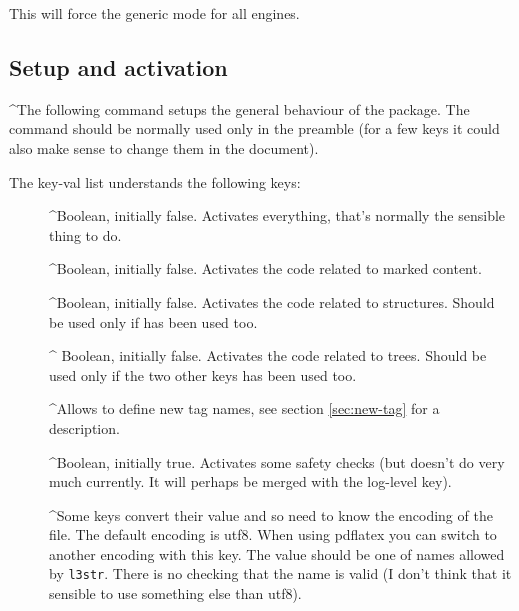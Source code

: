 \documentclass[DIV=12,parskip=half-,bibliography=totoc]{scrartcl}
\begin{document}

\TagP This will force the generic mode for all engines. \TagPend




\subsection{Setup and activation}\label{ssec:setup}

\TagP^The following command setups the general behaviour of the package. The command should be normally used only in the preamble (for a few keys it could also make sense to change them in the document).


\DescribeMacro{}


\TagP The key-val list understands the following keys:\TagPend
\begin{description}
\item[]
 \TagP^Boolean, initially false. Activates everything, that's normally the sensible thing to do.\Pmeti
\item[]
 \TagP^Boolean, initially false. Activates the code related to marked content.\Pmeti
\item[]
 \TagP^Boolean, initially false. Activates the code related to structures. Should be used only if  has been used too.\Pmeti
\item[]
\TagP^ Boolean, initially false. Activates the code related to trees. Should be used only if the two other keys has been used too.\Pmeti
\item[]
 \TagP^Allows to define new tag names, see section \ref{sec:new-tag} for a description.\Pmeti
\item[]
 \TagP^Boolean, initially true. Activates some safety checks (but doesn't do very much currently. It will perhaps be merged with the log-level key).\Pmeti
\item[]
 \TagP^Some keys convert their value and so need to know the encoding of the file. The default encoding is utf8.  When using pdflatex you can switch to another encoding with this key. The value should be one of names allowed by \texttt{l3str}. There is no checking that the name is valid (I don't think that it sensible to use something else than utf8).\Pmeti
\item[]

\end{description}
\end{document}

